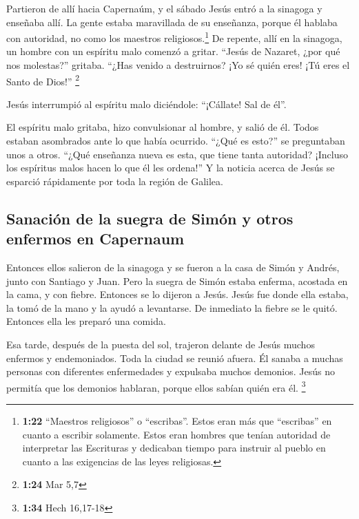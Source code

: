  Partieron de allí hacia Capernaúm, y el sábado Jesús
entró a la sinagoga y enseñaba allí.  La gente estaba
maravillada de su enseñanza, porque él hablaba con autoridad, no como
los maestros religiosos.\footnote{\textbf{1:22} ``Maestros religiosos''
  o ``escribas''. Estos eran más que ``escribas'' en cuanto a escribir
  solamente. Estos eran hombres que tenían autoridad de interpretar las
  Escrituras y dedicaban tiempo para instruir al pueblo en cuanto a las
  exigencias de las leyes religiosas.}  De repente, allí
en la sinagoga, un hombre con un espíritu malo comenzó a gritar.
 ``Jesús de Nazaret, ¿por qué nos molestas?'' gritaba.
``¿Has venido a destruirnos? ¡Yo sé quién eres! ¡Tú eres el Santo de
Dios!'' \footnote{\textbf{1:24} Mar 5,7}

 Jesús interrumpió al espíritu malo diciéndole:
``¡Cállate! Sal de él''.

 El espíritu malo gritaba, hizo convulsionar al hombre, y
salió de él.  Todos estaban asombrados ante lo que había
ocurrido. ``¿Qué es esto?'' se preguntaban unos a otros. ``¿Qué
enseñanza nueva es esta, que tiene tanta autoridad? ¡Incluso los
espíritus malos hacen lo que él les ordena!''  Y la
noticia acerca de Jesús se esparció rápidamente por toda la región de
Galilea.

\hypertarget{sanaciuxf3n-de-la-suegra-de-simuxf3n-y-otros-enfermos-en-capernaum}{%
\subsection{Sanación de la suegra de Simón y otros enfermos en
Capernaum}\label{sanaciuxf3n-de-la-suegra-de-simuxf3n-y-otros-enfermos-en-capernaum}}

 Entonces ellos salieron de la sinagoga y se fueron a la
casa de Simón y Andrés, junto con Santiago y Juan.  Pero
la suegra de Simón estaba enferma, acostada en la cama, y con fiebre.
Entonces se lo dijeron a Jesús.  Jesús fue donde ella
estaba, la tomó de la mano y la ayudó a levantarse. De inmediato la
fiebre se le quitó. Entonces ella les preparó una comida.

 Esa tarde, después de la puesta del sol, trajeron
delante de Jesús muchos enfermos y endemoniados.  Toda la
ciudad se reunió afuera.  Él sanaba a muchas personas con
diferentes enfermedades y expulsaba muchos demonios. Jesús no permitía
que los demonios hablaran, porque ellos sabían quién era él. \footnote{\textbf{1:34}
  Hech 16,17-18}

